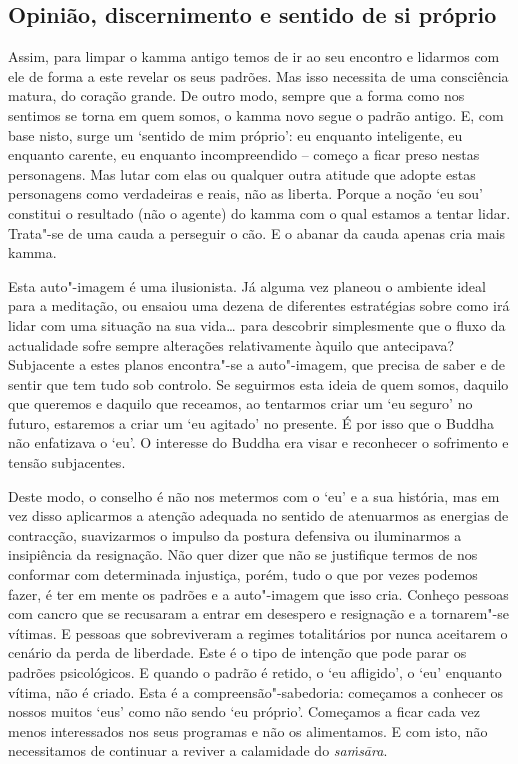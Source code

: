 \subsection{Opinião, discernimento e sentido de si próprio}

Assim, para limpar o kamma antigo temos de ir ao seu encontro e lidarmos com ele
de forma a este revelar os seus padrões. Mas isso necessita de uma consciência
matura, do coração grande. De outro modo, sempre que a forma como nos sentimos
se torna em quem somos, o kamma novo segue o padrão antigo. E, com base nisto,
surge um `sentido de mim próprio': eu enquanto inteligente, eu enquanto carente,
eu enquanto incompreendido -- começo a ficar preso nestas personagens. Mas lutar
com elas ou qualquer outra atitude que adopte estas personagens como verdadeiras
e reais, não as liberta. Porque a noção `eu sou' constitui o resultado (não o
agente) do kamma com o qual estamos a tentar lidar. Trata"-se de uma cauda a
perseguir o cão. E o abanar da cauda apenas cria mais kamma.

Esta auto"-imagem é uma ilusionista. Já alguma vez planeou o ambiente ideal para
a meditação, ou ensaiou uma dezena de diferentes estratégias sobre como irá
lidar com uma situação na sua vida\ldots{} para descobrir simplesmente que o fluxo da
actualidade sofre sempre alterações relativamente àquilo que antecipava?
Subjacente a estes planos encontra"-se a auto"-imagem, que precisa de saber e de
sentir que tem tudo sob controlo. Se seguirmos esta ideia de quem somos, daquilo
que queremos e daquilo que receamos, ao tentarmos criar um `eu seguro' no
futuro, estaremos a criar um `eu agitado' no presente. É por isso que o Buddha
não enfatizava o `eu'. O interesse do Buddha era visar e reconhecer o sofrimento
e tensão subjacentes.

Deste modo, o conselho é não nos metermos com o `eu' e a sua história, mas em
vez disso aplicarmos a atenção adequada no sentido de atenuarmos as energias de
contracção, suavizarmos o impulso da postura defensiva ou iluminarmos a
insipiência da resignação. Não quer dizer que não se justifique termos de nos
conformar com determinada injustiça, porém, tudo o que por vezes podemos fazer,
é ter em mente os padrões e a auto"-imagem que isso cria. Conheço pessoas com
cancro que se recusaram a entrar em desespero e resignação e a tornarem"-se
vítimas. E pessoas que sobreviveram a regimes totalitários por nunca aceitarem o
cenário da perda de liberdade. Este é o tipo de intenção que pode parar os
padrões psicológicos. E quando o padrão é retido, o `eu afligido', o `eu'
enquanto vítima, não é criado. Esta é a compreensão"-sabedoria: começamos a
conhecer os nossos muitos `eus' como não sendo `eu próprio'. Começamos a ficar
cada vez menos interessados nos seus programas e não os alimentamos. E com isto,
não necessitamos de continuar a reviver a calamidade do \emph{saṁsāra}.

